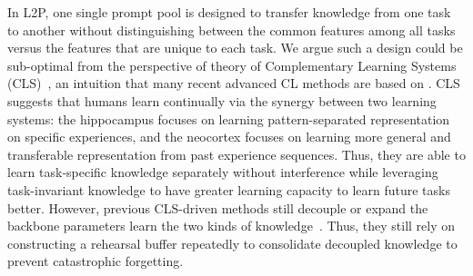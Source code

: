\documentclass[runningheads]{llncs}
\newcommand{\sayna}[1]{\textcolor{blue}{Sayna: #1}}
\newcommand{\zizhaoz}[1]{\textcolor{green}{Zizhao: #1}}
\begin{document}
In L2P, one single prompt pool is designed to transfer knowledge from one task to another without distinguishing between the common features among all tasks versus the features that are unique to each task. We argue such a design could be sub-optimal from the perspective of theory of Complementary Learning Systems (CLS)~\cite{mcclelland1995there,kumaran2016learning}, an intuition that many recent advanced CL methods are based on \cite{chaudhry2019tiny,pham2021dualnet,buzzega2020dark,arani2021learning}.
CLS suggests that humans learn continually via the synergy between two learning systems: the hippocampus focuses on learning pattern-separated representation on specific experiences, and the neocortex focuses on learning more general and transferable representation from past experience sequences. Thus, they are able to learn task-specific knowledge separately without interference while leveraging task-invariant knowledge to have greater learning capacity to learn future tasks better. %
However, previous CLS-driven methods still decouple or expand the backbone parameters learn the two kinds of knowledge~\cite{ebrahimi2020adversarial,pham2021dualnet,pham2020contextual}.
Thus, they still rely on constructing a rehearsal buffer repeatedly to consolidate decoupled knowledge to prevent catastrophic forgetting. 
\end{document}
